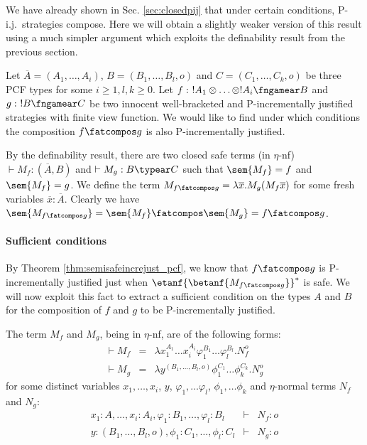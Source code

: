 We have already shown in Sec. \ref{sec:closedpij} that under certain
conditions, P-i.j.\ strategies compose. Here we will obtain a
slightly weaker version of this result using a much simpler argument
which exploits the definability result from the previous section.


 Let $\overline{A} = (A_1, \ldots, A_i)$, $B = (B_1, \ldots,
B_l,o)$ and $C=(C_1,\ldots,C_k,o)$ be three PCF types for some
$i\geq 1,l,k\geq 0$. Let $f:\ !A_1 \otimes \ldots \otimes !A_i
\fngamear B$ and $g:\ !B\fngamear C$ be two innocent well-bracketed
and P-incrementally justified strategies with finite view function.
We would like to find under which conditions the composition
$f\fatcompos g$ is also P-incrementally justified.

By the definability result, there are two closed safe terms (in $\eta$-nf) $\vdash M_f :(\overline{A},B)$  and $\vdash M_g :B \typear C$ such that $\sem{M_f} = f$
and $\sem{M_f} = g$.
We define the term $M_{f\fatcompos g} = \lambda \overline{x} . M_g (M_f \overline{x})$ for some fresh variables $\overline{x} : \overline{A}$. Clearly we have $\sem{M_{f\fatcompos g}} = \sem{M_f} \fatcompos \sem{M_g} = f\fatcompos g$.

\paragraph{Sufficient conditions}

By Theorem \ref{thm:semisafeincrejust_pcf}, we know that $f\fatcompos g$ is P-incrementally justified just when $\etanf{\betanf{M_{f\fatcompos g}}}^*$ is safe.
We will now exploit this fact to extract a sufficient condition on the types $A$ and $B$ for
the composition of $f$ and $g$ to be P-incrementally justified.

The term $M_f$ and $M_g$, being in $\eta$-nf, are of the following forms:
\begin{eqnarray*}
\vdash M_f &=& \lambda x_1^{A_1} \ldots x_i^{A_i} \varphi_1^{B_1} \ldots \varphi_l^{B_l} . N_f^o\\
\vdash  M_g &=& \lambda y^{ (B_1, \ldots, B_l,o)} \phi_1^{C_1} \ldots \phi_k^{C_k} . N_g^o
\end{eqnarray*}
for some distinct variables $x_1, \ldots, x_i$, $y$, $\varphi_1, \dots \varphi_l$, $\phi_1, \dots \phi_k$  and $\eta$-normal terms $N_f$ and $N_g$:
\begin{eqnarray*}
x_1:A, \ldots, x_i:A_i, \varphi_1:B_1, \dots, \varphi_l:B_l &\vdash& N_f :o \\
y: (B_1, \ldots, B_l,o), \phi_1:C_1, \dots, \phi_l:C_l &\vdash& N_g :o
\end{eqnarray*}



